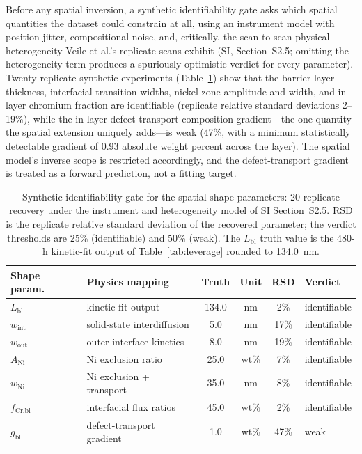 \documentclass[preprint,12pt]{elsarticle}
\begin{document}
Before any spatial inversion, a synthetic identifiability gate asks
which spatial quantities the dataset could constrain at all, using an
instrument model with position jitter, compositional noise, and,
critically, the scan-to-scan physical heterogeneity Veile et al.'s
replicate scans exhibit (SI, Section~S2.5; omitting the heterogeneity
term produces a spuriously optimistic verdict for every parameter).
Twenty replicate synthetic experiments (Table~\ref{tab:t2a}) show that
the barrier-layer thickness, interfacial transition widths, nickel-zone
amplitude and width, and in-layer chromium fraction are identifiable
(replicate relative standard deviations 2--19\%), while the in-layer
defect-transport composition gradient---the one quantity the spatial
extension uniquely adds---is weak (47\%, with a minimum statistically
detectable gradient of 0.93 absolute weight percent across the layer).
The spatial model's inverse scope is restricted accordingly, and the
defect-transport gradient is treated as a forward prediction, not a
fitting target.

\begin{table}[htbp]
\centering
\caption{Synthetic identifiability gate for the spatial shape
parameters: 20-replicate recovery under the instrument and
heterogeneity model of SI Section~S2.5. RSD is the replicate relative
standard deviation of the recovered parameter; the verdict thresholds
are 25\% (identifiable) and 50\% (weak). The $L_\text{bl}$ truth value is
the 480-h kinetic-fit output of Table~\ref{tab:leverage} rounded to
134.0~nm.}
\label{tab:t2a}
\small
\begin{tabular}{llcccl}
\toprule
Shape param. & Physics mapping & Truth & Unit & RSD & Verdict \\
\midrule
$L_\text{bl}$ & kinetic-fit output & 134.0 & nm & 2\% & identifiable \\
$w_\text{int}$ & solid-state interdiffusion & 5.0 & nm & 17\% & identifiable \\
$w_\text{out}$ & outer-interface kinetics & 8.0 & nm & 19\% & identifiable \\
$A_\text{Ni}$ & Ni exclusion ratio & 25.0 & wt\% & 7\% & identifiable \\
$w_\text{Ni}$ & Ni exclusion + transport & 35.0 & nm & 8\% & identifiable \\
$f_\text{Cr,bl}$ & interfacial flux ratios & 45.0 & wt\% & 2\% & identifiable \\
$g_\text{bl}$ & defect-transport gradient & 1.0 & wt\% & 47\% & weak \\
\bottomrule
\end{tabular}
\end{table}
\end{document}
